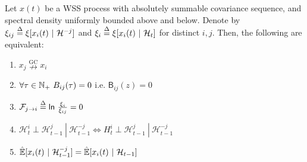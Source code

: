 \documentclass[12pt]{article}
\def\ngc{\overset{\text{GC}}{\nrightarrow}}  %
\def\B{\mathsf{B}}  %
\def\H{\mathcal{H}}  %
\newcommand{\linE}[2]{\hat{\E}[#1\ |\ #2]}  %
\newcommand{\linEerr}[2]{\xi[#1\ |\ #2]}  %
\begin{document}
\begin{theorem}
  \label{thm:granger_causality_equivalences}
  Let $x(t)$ be a WSS process with absolutely summable covariance
  sequence, and spectral density uniformly bounded above and below.
  Denote by $\xi_{ij} \defeq \linEerr{x_i(t)}{\H^{-j}}$ and
  $\xi_i \defeq \linEerr{x_i(t)}{\H_t}$ for distinct $i, j$.  Then,
  the following are equivalent:

  \begin{enumerate}
    \item{$x_j \ngc x_i$}
    \item{$\forall \tau \in \N_+\ B_{ij}(\tau) = 0$ i.e. $\B_{ij}(z) = 0$}
    \item{$\mathcal{F}_{j \rightarrow i} \overset{\Delta}{=} \mathsf{ln\ }\frac{\xi_i}{\xi_{ij}} = 0$}
    \item{$\H_t^{i} \perp \H_{t - 1}^{j}\ |\ \H_{t - 1}^{-j} \iff H_t^{i} \perp \H_{t - 1}^{j}\ |\ \H_{t - 1}^{-j}$}
    \item{$\linE{x_i(t)}{\H_{t - 1}^{-j}} = \linE{x_i(t)}{\H_{t - 1}}$}
  \end{enumerate}
\end{theorem}
\end{document}
